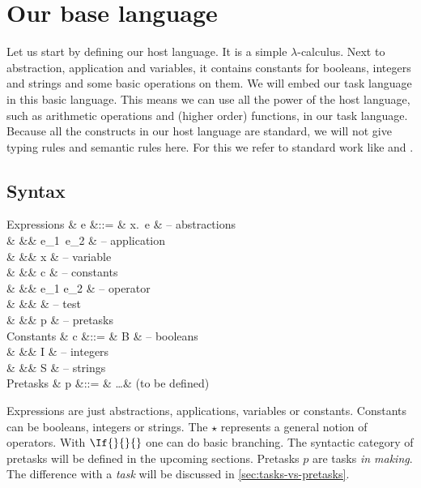 
\section{Our base language}

Let us start by defining our host language.
It is a simple $\lambda$-calculus.
Next to abstraction, application and variables,
it contains constants for booleans, integers and strings
and some basic operations on them.
We will embed our task language in this basic language.
This means we can use all the power of the host language,
such as arithmetic operations and (higher order) functions,
in our task language.
Because all the constructs in our host language are standard,
we will not give typing rules and semantic rules here.
For this we refer to standard work like \textcite{books/Pierce02TAPL} and \textcite{books/Harper16PFPL}.


\subsection{Syntax}
\label{sec:syntax}

\begin{grammar}
  Expressions
    & e &::= & \lambda x.\ e      & – abstractions \\
    &   &\mid& e_1\ e_2           & – application \\
    &   &\mid& x                  & – variable \\
    &   &\mid& c                  & – constants \\
    &   &\mid& e_1 \star e_2      & – operator \\
    &   &\mid&  & – test \\
    &   &\mid& p                  & – pretasks \\
  Constants
    & c &::= & B                  & – booleans \\
    &   &\mid& I                  & – integers \\
    &   &\mid& S                  & – strings \\
  Pretasks
    & p &::= & \ldots             & (to be defined) \\
\end{grammar}
Expressions are just abstractions, applications, variables or constants.
Constants can be booleans, integers or strings.
The $\star$ represents a general notion of operators.
With $\If{}{}{}$ one can do basic branching.
The syntactic category of pretasks will be defined in the upcoming sections.
Pretasks $p$ are tasks \emph{in making}.
The difference with a \emph{task} will be discussed in \autoref{sec:tasks-vs-pretasks}.

